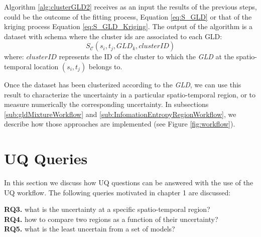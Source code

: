 Algorithm \ref{alg:clusterGLD2} receives as an input the results of the previous steps, could be the outcome of the fitting process, Equation \ref{eq:S_GLD} or that of the kriging process Equation \ref{eq:S_GLD_Kriging}. The output of the algorithm is a dataset with schema where the cluster ids are associated to each GLD:
\begin{equation}
S_{\mathcal{C}}(s_{i},t_{j},GLD_{k},clusterID)
\end{equation}
where:
$clusterID$ represents the ID of the cluster to which the \textit{GLD} at the spatio-temporal location $(s_{i},t_{j})$ belongs to.

Once the dataset has been clusterized according to the \textit{GLD}, we can use this result to characterize the uncertainty in a particular spatio-temporal region, or to measure numerically the corresponding uncertainty. In subsections \ref{sub:gldMixtureWorkflow} and \ref{sub:InfomationEntropyRegionWorkflow}, we describe how those approaches are implemented (see Figure \ref{fig:workflow}).

\section{UQ Queries}\label{sec:queries}
In this section we discuss how UQ questions can be answered with the use of the UQ workflow. The following queries motivated in chapter 1 are discussed:

\begin{tcolorbox}
\textbf{RQ3.} what is the uncertainty at a specific spatio-temporal region? \\
\textbf{RQ4.} how to compare two regions as a function of their uncertainty? \\
\textbf{RQ5.} what is the least uncertain from a set of models?
\end{tcolorbox}



